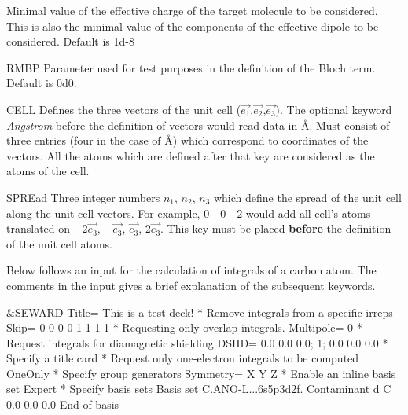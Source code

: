 \begin{keywordlist}
Minimal value of the effective charge of the target molecule
to be considered. This is also the
minimal value of the components of the effective dipole
to be considered. Default is 1d-{}8
\item[RMBP]
Parameter used for test purposes in the definition of the
Bloch term. Default is 0d0.
\item[CELL]
Defines the three vectors of the unit cell ($\vec{e_1}$,$\vec{e_2}$,$\vec{e_3}$).
The optional keyword
{\it Angstrom} before the definition of vectors would read data in \AA.
Must consist of three entries (four in the case of \AA) which correspond to coordinates of the vectors. All the atoms which
are defined after that key are considered as the atoms of the cell.
\item[SPREad]
Three integer numbers $n_1$, $n_2$, $n_3$ which define the spread of the unit cell along the unit cell vectors.
For example, $0\quad 0\quad 2$ would add all cell's atoms translated on $-2\vec{e_3}$, $-\vec{e_3}$, $\vec{e_3}$, $2\vec{e_3}$.
This key must be placed {\bf before} the definition of the unit cell atoms.
\end{keywordlist}

Below follows an input for the calculation of integrals of a carbon
atom. The comments in the input gives a brief explanation of the
subsequent keywords.

\begin{inputlisting}
 &SEWARD
Title= This is a test deck!
* Remove integrals from a specific irreps
Skip= 0 0 0 0 1 1 1 1
* Requesting only overlap integrals.
Multipole= 0
* Request integrals for diamagnetic shielding
DSHD= 0.0 0.0 0.0; 1; 0.0 0.0 0.0
* Specify a title card
* Request only one{-}electron integrals to be computed
OneOnly
* Specify group generators
Symmetry= X Y Z
* Enable an inline basis set
Expert
* Specify basis sets
Basis set
C.ANO-L...6s5p3d2f.
Contaminant d
C  0.0 0.0 0.0
End of basis
\end{inputlisting}

